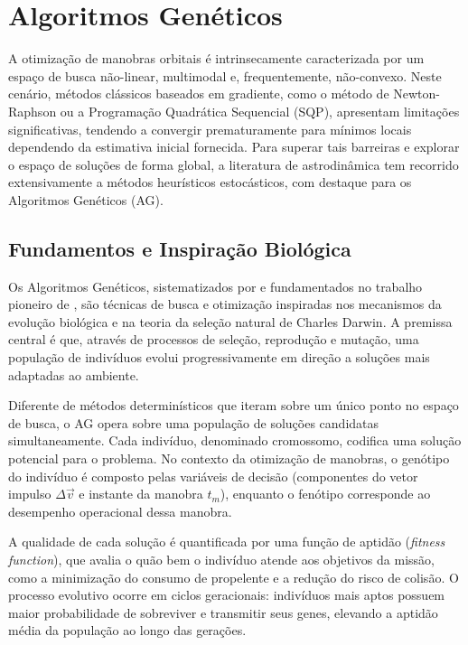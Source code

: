 \section{Algoritmos Genéticos}
\label{sec:algoritmos_geneticos}

A otimização de manobras orbitais é intrinsecamente caracterizada por um espaço de busca não-linear, multimodal e, frequentemente, não-convexo. Neste cenário, métodos clássicos baseados em gradiente, como o método de Newton-Raphson ou a Programação Quadrática Sequencial (SQP), apresentam limitações significativas, tendendo a convergir prematuramente para mínimos locais dependendo da estimativa inicial fornecida. Para superar tais barreiras e explorar o espaço de soluções de forma global, a literatura de astrodinâmica tem recorrido extensivamente a métodos heurísticos estocásticos, com destaque para os Algoritmos Genéticos (AG).

\subsection{Fundamentos e Inspiração Biológica}

Os Algoritmos Genéticos, sistematizados por  e fundamentados no trabalho pioneiro de , são técnicas de busca e otimização inspiradas nos mecanismos da evolução biológica e na teoria da seleção natural de Charles Darwin. A premissa central é que, através de processos de seleção, reprodução e mutação, uma população de indivíduos evolui progressivamente em direção a soluções mais adaptadas ao ambiente.

Diferente de métodos determinísticos que iteram sobre um único ponto no espaço de busca, o AG opera sobre uma população de soluções candidatas simultaneamente. Cada indivíduo, denominado cromossomo, codifica uma solução potencial para o problema. No contexto da otimização de manobras, o genótipo do indivíduo é composto pelas variáveis de decisão (componentes do vetor impulso $\Delta \vec{v}$ e instante da manobra $t_m$), enquanto o fenótipo corresponde ao desempenho operacional dessa manobra.

A qualidade de cada solução é quantificada por uma função de aptidão (\textit{fitness function}), que avalia o quão bem o indivíduo atende aos objetivos da missão, como a minimização do consumo de propelente e a redução do risco de colisão. O processo evolutivo ocorre em ciclos geracionais: indivíduos mais aptos possuem maior probabilidade de sobreviver e transmitir seus genes, elevando a aptidão média da população ao longo das gerações.




